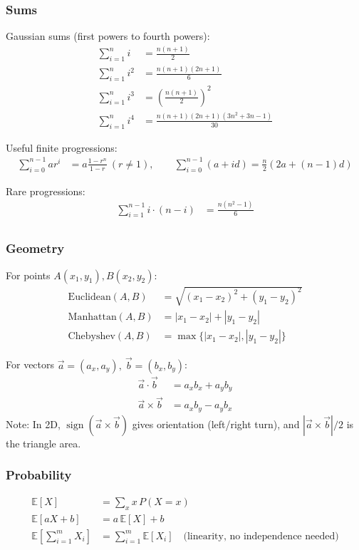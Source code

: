 \documentclass[10pt,letterpaper,landscape,twocolumn]{article}
\begin{document}
\subsubsection{Sums}
Gaussian sums (first powers to fourth powers):
\begin{align*}
\sum_{i=1}^{n} i &= \frac{n(n+1)}{2} \\
\sum_{i=1}^{n} i^2 &= \frac{n(n+1)(2n+1)}{6} \\
\sum_{i=1}^{n} i^3 &= \left(\frac{n(n+1)}{2}\right)^2 \\
\sum_{i=1}^{n} i^4 &= \frac{n(n+1)(2n+1)(3n^2+3n-1)}{30}
\end{align*}

Useful finite progressions:
\begin{align*}
\sum_{i=0}^{n-1} ar^i &= a\frac{1-r^n}{1-r} \ (r\neq 1), \qquad
\sum_{i=0}^{n-1} (a+id) = \frac{n}{2}\left(2a+(n-1)d\right)
\end{align*}

Rare progressions:
\begin{align*}
\sum_{i=1}^{n-1} i\cdot (n-i) &= \frac{n(n^2-1)}{6} \\
\end{align*}


\subsubsection{Geometry}
For points $A(x_1,y_1), B(x_2,y_2)$:
\begin{align*}
\text{Euclidean}(A,B) &= \sqrt{(x_1-x_2)^2 + (y_1-y_2)^2} \\
\text{Manhattan}(A,B) &= |x_1-x_2| + |y_1-y_2| \\
\text{Chebyshev}(A,B) &= \max\{|x_1-x_2|, |y_1-y_2|\}
\end{align*}

For vectors $\vec{a}=(a_x,a_y),\ \vec{b}=(b_x,b_y)$:
\begin{align*}
\vec{a}\cdot\vec{b} &= a_xb_x+a_yb_y \\
\vec{a}\times\vec{b} &= a_xb_y-a_yb_x
\end{align*}
Note: In 2D, $\operatorname{sign}(\vec{a}\times\vec{b})$ gives orientation (left/right turn), and
$|\vec{a}\times\vec{b}|/2$ is the triangle area.

\subsubsection{Probability}
\begin{align*}
\mathbb{E}[X] &= \sum_x x\,P(X=x) \\
\mathbb{E}[aX+b] &= a\,\mathbb{E}[X]+b \\
\mathbb{E}\!\left[\sum_{i=1}^{m} X_i\right] &= \sum_{i=1}^{m}\mathbb{E}[X_i] \quad \text{(linearity, no independence needed)}
\end{align*}
\end{document}
